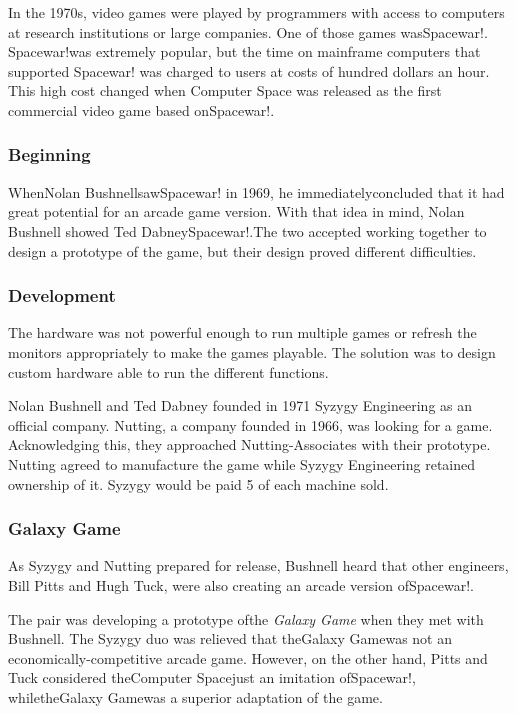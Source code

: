 \documentclass[a4paper,10pt]{book}
\begin{document}
            In the 1970s, video games were played by programmers with access to computers at research institutions or large companies. One of those games wasSpacewar!. 
            Spacewar!was extremely popular, but the time on mainframe computers that supported Spacewar! was charged to users at costs of hundred dollars an hour.  
            This high cost changed when Computer Space was released as the first commercial video game based onSpacewar!. 
 
 \subsubsection{Beginning }
 
            WhenNolan BushnellsawSpacewar! in 1969, he immediatelyconcluded that it had great potential for an arcade game version. With that idea in mind, Nolan Bushnell showed Ted DabneySpacewar!.The two accepted working together to design a prototype of the game, but their design proved different difficulties.
           
 \subsubsection{Development }
 
            The hardware was not powerful enough to run multiple games or refresh the monitors appropriately to make the games playable. The solution was to design custom hardware able to run the different functions.
           
 
            Nolan Bushnell and Ted Dabney founded in 1971 Syzygy Engineering as an official company. Nutting, a company founded in 1966, was looking for a game. Acknowledging this, they approached Nutting-Associates with their prototype. 
            Nutting agreed to manufacture the game while Syzygy Engineering retained ownership of it. Syzygy would be paid 5 of each machine sold.
           
 \subsubsection{Galaxy Game }
 
            As Syzygy and Nutting prepared for release, Bushnell heard that other engineers, Bill Pitts and Hugh Tuck, were also creating an arcade version ofSpacewar!.
           
 
            The pair was developing a prototype ofthe  \textit{Galaxy Game }when they met with Bushnell.  
            The Syzygy duo was relieved that theGalaxy Gamewas not an economically-competitive arcade game.  
            However, on the other hand, Pitts and Tuck considered theComputer Spacejust an imitation ofSpacewar!, whiletheGalaxy Gamewas a superior adaptation of the game.
           
\end{document}
